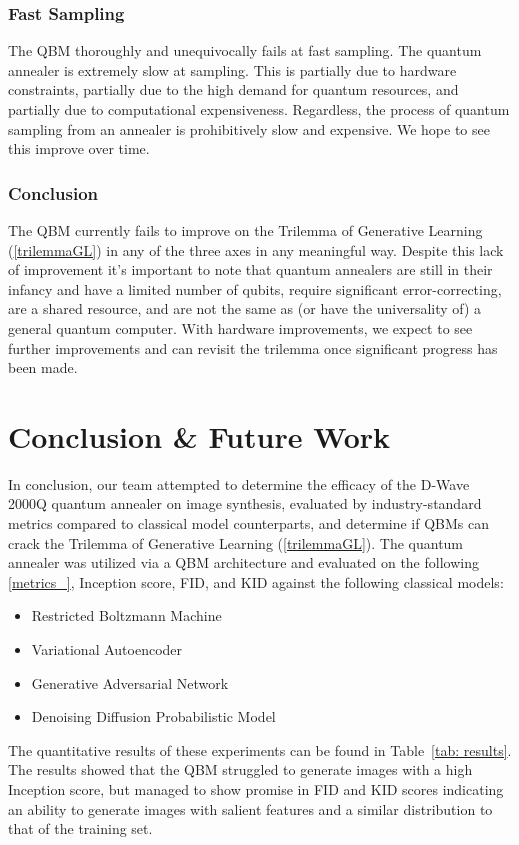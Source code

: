 \documentclass[%
 reprint,
 amsmath,amssymb,
 aps,
]{revtex4-2}
\begin{document}
\subsubsection{Fast Sampling}
The QBM thoroughly and unequivocally fails at fast sampling. The quantum annealer is extremely slow at sampling. This is partially due to hardware constraints, partially due to the high demand for quantum resources, and partially due to computational expensiveness. Regardless, the process of quantum sampling from an annealer is prohibitively slow and expensive. We hope to see this improve over time.

\subsubsection{Conclusion}
The QBM currently fails to improve on the Trilemma of Generative Learning (\ref{trilemmaGL}) in any of the three axes in any meaningful way. Despite this lack of improvement it's important to note that quantum annealers are still in their infancy and have a limited number of qubits, require significant error-correcting, are a shared resource, and are not the same as (or have the universality of) a general quantum computer. With hardware improvements, we expect to see further improvements and can revisit the trilemma once significant progress has been made.

\section{Conclusion \& Future Work}
\label{future}
In conclusion, our team attempted to determine the efficacy of the D-Wave 2000Q quantum annealer on image synthesis, evaluated by industry-standard metrics compared to classical model counterparts, and determine if QBMs can crack the Trilemma of Generative Learning (\ref{trilemmaGL}). The quantum annealer was utilized via a QBM architecture and evaluated on the following \ref{metrics_}, Inception score, FID, and KID against the following classical models:
\begin{itemize}
\item Restricted Boltzmann Machine
\item Variational Autoencoder
\item Generative Adversarial Network
\item Denoising Diffusion Probabilistic Model
\end{itemize}


The quantitative results of these experiments can be found in Table~\ref{tab: results}. The results showed that the QBM struggled to generate images with a high Inception score, but managed to show promise in FID and KID scores indicating an ability to generate images with salient features and a similar distribution to that of the training set.
\end{document}
